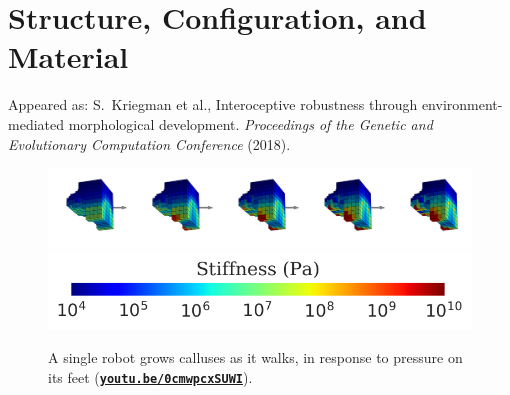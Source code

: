 

\chapter{Structure, Configuration, and Material}


\vspace{-2em}

{\footnotesize
\noindent
Appeared as:
S.~Kriegman et al., Interoceptive robustness through environment-mediated morphological development. \textit{Proceedings of the Genetic and Evolutionary Computation Conference} (2018).
}


\begin{figure}[!h]
    \centering
    \includegraphics[width=\linewidth]{Chapter06/img/Callosities} \\
    \vspace{-0.5em}
    \includegraphics[width=0.35\linewidth]{Chapter06/img/colorbar} \\
    \caption{A single robot grows calluses as it walks, 
    in response to pressure on its feet   
    (\href{https://youtu.be/0cmwpcxSUWI}{\textbf{\texttt{youtu.be/0cmwpcxSUWI}}}).
    } %
    \label{fig:calluses}
\end{figure}

